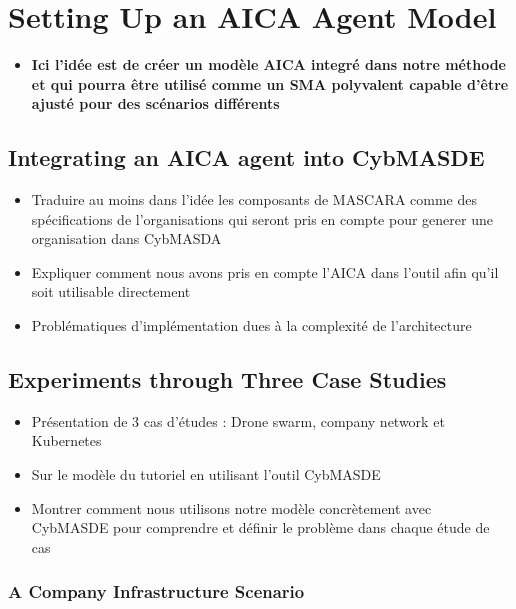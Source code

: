\chapter{Setting Up an AICA Agent Model}\label{ch:case_studies} %

\begin{itemize}
    \item \textbf{Ici l'idée est de créer un modèle AICA integré dans notre méthode et qui pourra être utilisé comme un SMA polyvalent capable d'être ajusté pour des scénarios différents}
\end{itemize}


\section{Integrating an AICA agent into CybMASDE}
\begin{itemize}
    \item Traduire au moins dans l'idée les composants de MASCARA comme des spécifications de l'organisations qui seront pris en compte pour generer une organisation dans CybMASDA
    \item Expliquer comment nous avons pris en compte l'AICA dans l'outil afin qu'il soit utilisable directement
    \item Problématiques d'implémentation dues à la complexité de l'architecture
\end{itemize}


\section{Experiments through Three Case Studies}
\begin{itemize}
    \item Présentation de 3 cas d’études : Drone swarm, company network et Kubernetes
    \item Sur le modèle du tutoriel en utilisant l'outil CybMASDE
    \item Montrer comment nous utilisons notre modèle concrètement avec CybMASDE pour comprendre et définir le problème dans chaque étude de cas
\end{itemize}

\subsection{A Company Infrastructure Scenario}
